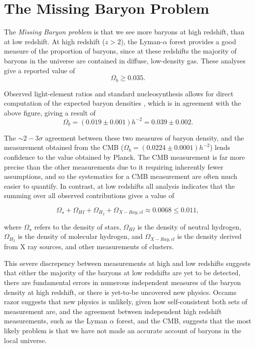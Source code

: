 \chapter{The Missing Baryon Problem}

The \emph{Missing Baryon problem} is that we see more baryons at high redshift, than at low redshift. At high redshift ($z>2$), the Lyman-$\alpha$ forest provides a good measure of the proportion of baryons, since at these redshifts the majority of baryons in the universe are contained in diffuse, low-density gas. These analyses give a reported value of
$$\Omega_{b} \geq 0.035. $$ 

Observed light-element ratios and standard nucleosynthesis allows for direct computation of the expected baryon densities \citep{1998sese.conf..113B}, which is in agreement with the above figure, giving a result of 
$$\Omega_{b} = (0.019\pm 0.001)h^{-2} = 0.039 \pm 0.002. $$

The $\sim 2-3 \sigma$ agreement between these two measures of baryon density, and the measurement obtained from the CMB ($\Omega_{b} = (0.0224 \pm 0.0001) h^{-2}$) lends confidence to the value obtained by Planck. The CMB measurement is far more precise than the other measurements due to it requiring inherently fewer assumptions, and so the systematics for a CMB measurement are often much easier to quantify. In contrast, at low redshifts all analysis indicates that the summing over all observed contributions gives a value of 

$$\Omega_\star + \Omega_{HI} + \Omega_{H_2} + \Omega_{X-Ray,cl} \approx 0.0068 \leq 0.011, $$

where $\Omega_\star$ refers to the density of stars, $\Omega_{HI}$ is the density of neutral hydrogen, $\Omega_{H_2}$ is the density of molecular hydrogen, and $\Omega_{X-Ray,cl} $ is the density derived from X ray sources, and other measurements of clusters.
\par This severe discrepency between measurements at high and low redshifts suggests that either the majority of the baryons at low redshifts are yet to be detected, there are fundamental errors in numerous independent measures of the baryon density at high redshift, or there is yet-to-be uncovered new physics. Occams razor suggests that new physics is unlikely, given how self-consistent both sets of measurement are, and the agreement between independent high redshift measurements, such as the Lyman $\alpha$ forest, and the CMB, suggests that the most likely problem is that we have not made an accurate account of baryons in the local universe.

